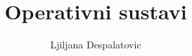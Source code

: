 \usepackage{verbatim}
\usepackage[disable]{todonotes}

\usepackage{bitset}

\setlength{\parskip}{6pt} %

\newcommand{\ld}[1]{\textcolor[rgb]{1.00,0.50,0.00}
{\noindent\ensuremath{\langle}\textit{napomena: #1}\ensuremath{\rangle}}}
\newcommand{\bb}[1]{\textcolor[rgb]{1.00,0.00,0.00}
{\noindent\ensuremath{\langle}\textit{ljiljana: #1}\ensuremath{\rangle}}}

\author{Ljiljana Despalatovic}
\title{Operativni sustavi}

